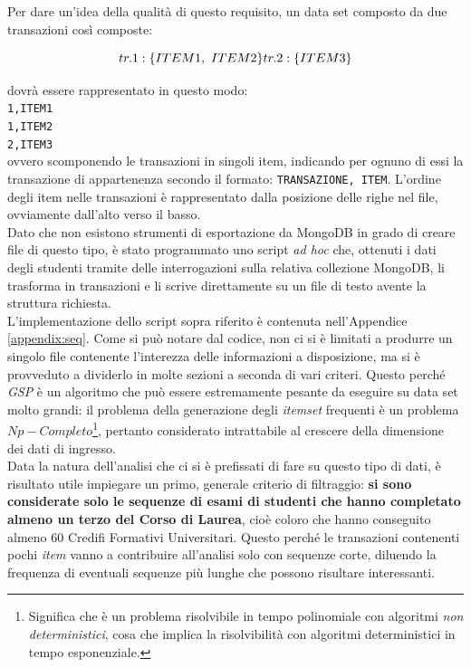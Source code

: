 	Per dare un'idea della qualità di questo requisito, un data set composto da due transazioni così composte: 
	
	\[tr. 1: \{ITEM1,\ ITEM2\} \\
	tr. 2: \{ITEM3\}\]

	\vspace{0.2cm}

	\noindent dovrà essere rappresentato in questo modo: \\

	\noindent\texttt{1,ITEM1}\\
	\texttt{1,ITEM2}\\
	\texttt{2,ITEM3}\\

	\noindent ovvero scomponendo le transazioni in singoli item, indicando per ognuno di essi la transazione di appartenenza secondo il formato: \texttt{TRANSAZIONE, ITEM}. L'ordine degli item nelle transazioni è rappresentato dalla posizione delle righe nel file, ovviamente dall'alto verso il basso. \\

	Dato che non esistono strumenti di esportazione da MongoDB in grado di creare file di questo tipo, è stato programmato uno script \textit{ad hoc} che, ottenuti i dati degli studenti tramite delle interrogazioni sulla relativa collezione MongoDB, li trasforma in transazioni e li scrive direttamente su un file di testo avente la struttura richiesta. \\

	L'implementazione dello script sopra riferito è contenuta nell'Appendice \ref{appendix:seq}. Come si può notare dal codice, non ci si è limitati a produrre un singolo file contenente l'interezza delle informazioni a disposizione, ma si è provveduto a dividerlo in molte sezioni a seconda di vari criteri. Questo perché \textit{GSP} è un algoritmo che può essere estremamente pesante da eseguire su data set molto grandi: il problema della generazione degli \textit{itemset} frequenti è un problema $Np-Completo$\footnote{Significa che è un problema risolvibile in tempo polinomiale con algoritmi \textit{non deterministici}, cosa che implica la risolvibilità con algoritmi deterministici in tempo esponenziale.}, pertanto considerato intrattabile al crescere della dimensione dei dati di ingresso.\\

	Data la natura dell'analisi che ci si è prefissati di fare su questo tipo di dati, è risultato utile impiegare un primo, generale criterio di filtraggio: \textbf{si sono considerate solo le sequenze di esami di studenti che hanno completato almeno un terzo del Corso di Laurea}, cioè coloro che hanno conseguito almeno 60 Credifi Formativi Universitari. Questo perché le transazioni contenenti pochi \textit{item} vanno a contribuire all'analisi solo con sequenze corte, diluendo la frequenza di eventuali sequenze più lunghe che possono risultare interessanti. \\

